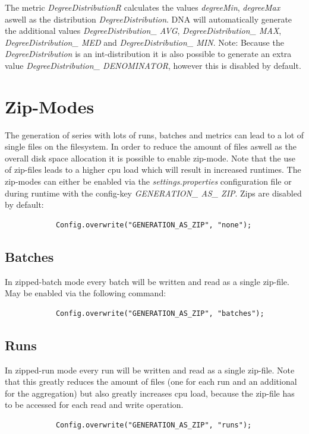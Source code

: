 The metric \textit{DegreeDistributionR} calculates the values \textit{degreeMin}, \textit{degreeMax} aswell as the distribution \textit{DegreeDistribution}. DNA will automatically generate the additional values \textit{DegreeDistribution\_ AVG}, \textit{DegreeDistribution\_ MAX}, \textit{DegreeDistribution\_ MED} and \textit{DegreeDistribution\_ MIN}. Note: Because the \textit{DegreeDistribution} is an int-distribution it is also possible to generate an extra value \textit{DegreeDistribution\_ DENOMINATOR}, however this is disabled by default.

\section{Zip-Modes}
The generation of series with lots of runs, batches and metrics can lead to a lot of single files on the filesystem. In order to reduce the amount of files aswell as the overall disk space allocation it is possible to enable zip-mode. Note that the use of zip-files leads to a higher cpu load which will result in increased runtimes. The zip-modes can either be enabled via the \textit{settings.properties} configuration file or during runtime with the config-key \textit{GENERATION\_ AS\_ ZIP}. Zips are disabled by default:
\begin{lstlisting}
			Config.overwrite("GENERATION_AS_ZIP", "none");
\end{lstlisting}

\subsection{Batches}
In zipped-batch mode every batch will be written and read as a single zip-file. May be enabled via the following command:
\begin{lstlisting}
			Config.overwrite("GENERATION_AS_ZIP", "batches");
\end{lstlisting}

\subsection{Runs}
In zipped-run mode every run will be written and read as a single zip-file. Note that this greatly reduces the amount of files (one for each run and an additional for the aggregation) but also greatly increases cpu load, because the zip-file has to be accessed for each read and write operation.
\begin{lstlisting}
			Config.overwrite("GENERATION_AS_ZIP", "runs");
\end{lstlisting}